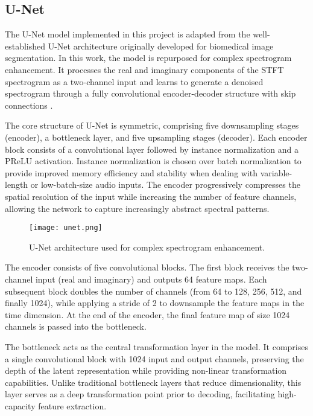 \subsection{U-Net}

The U-Net model implemented in this project is adapted from the well-established U-Net architecture originally developed for biomedical image segmentation. In this work, the model is repurposed for complex spectrogram enhancement. It processes the real and imaginary components of the STFT spectrogram as a two-channel input and learns to generate a denoised spectrogram through a fully convolutional encoder-decoder structure with skip connections \cite{ronneberger2015unet}.

The core structure of U-Net is symmetric, comprising five downsampling stages (encoder), a bottleneck layer, and five upsampling stages (decoder). Each encoder block consists of a convolutional layer followed by instance normalization and a PReLU activation. Instance normalization is chosen over batch normalization to provide improved memory efficiency and stability when dealing with variable-length or low-batch-size audio inputs. The encoder progressively compresses the spatial resolution of the input while increasing the number of feature channels, allowing the network to capture increasingly abstract spectral patterns.

\begin{figure}[h]
    \centering
    \texttt{[image: unet.png]}
    \caption{\label{fig:unet}U-Net architecture used for complex spectrogram enhancement.}
\end{figure}

The encoder consists of five convolutional blocks. The first block receives the two-channel input (real and imaginary) and outputs 64 feature maps. Each subsequent block doubles the number of channels (from 64 to 128, 256, 512, and finally 1024), while applying a stride of 2 to downsample the feature maps in the time dimension. At the end of the encoder, the final feature map of size 1024 channels is passed into the bottleneck.

The bottleneck acts as the central transformation layer in the model. It comprises a single convolutional block with 1024 input and output channels, preserving the depth of the latent representation while providing non-linear transformation capabilities. Unlike traditional bottleneck layers that reduce dimensionality, this layer serves as a deep transformation point prior to decoding, facilitating high-capacity feature extraction.

